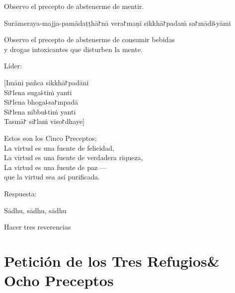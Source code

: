 \enlargethispage{\baselineskip}

\begin{english}
  Observo el precepto de abstenerme de mentir.
\end{english}

\clearpage

\begin{precept}
  \setcounter{enumi}{4}
  \item Surāmeraya-majja-pamādaṭṭhā꜓nā vera꜓maṇī sikkhā꜓padaṁ sa꜓mādi꜕yāmi
\end{precept}

\begin{english}
  Observo el precepto de abstenerme de consumir bebidas\\
  y drogas intoxicantes que disturben la mente.
\end{english}

\begin{instruction}
  Líder:
\end{instruction}

[Imāni pañca sikkhā꜓padāni\\
Sī꜓lena suga꜕tiṁ yanti\\
Sī꜓lena bhoga꜕sa꜓mpadā\\
Sī꜓lena nibbu꜕tiṁ yanti\\
Tasmā꜓ sī꜓laṁ viso꜓dhaye]

\begin{english}
  Estos son los Cinco Preceptos;\\
  La virtud es una fuente de felicidad,\\
  La virtud es una fuente de verdadera riqueza,\\
  La virtud es una fuente de paz ---\\
  que la virtud sea así purificada.
\end{english}

\begin{instruction}
  Respuesta:
\end{instruction}

Sādhu, sādhu, sādhu

\begin{instruction}
  Hacer tres reverencias
\end{instruction}

\clearpage
\chapter[Tres Refugios \& Ocho Preceptos]{Petición de los Tres Refugios\newline \& Ocho Preceptos}

